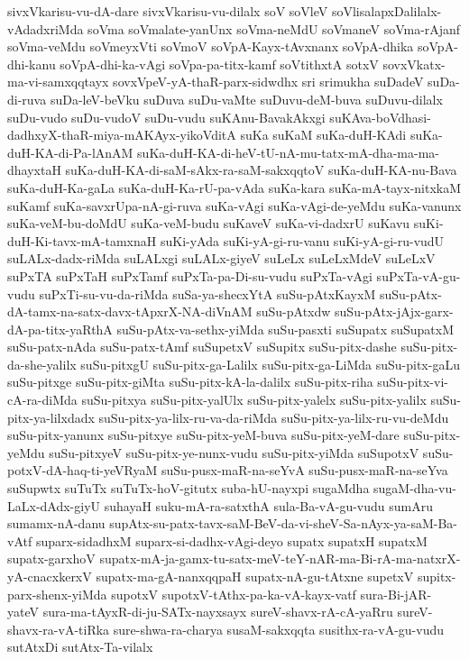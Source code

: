 {sivxVkarisu-vu-dA-dare
sivxVkarisu-vu-dilalx
soV
soVleV
soVlisalapxDalilalx-vAdadxriMda
soVma
soVmalate-yanUnx
soVma-neMdU
soVmaneV
soVma-rAjanf
soVma-veMdu
soVmeyxVti
soVmoV
soVpA-Kayx-tAvxnanx
soVpA-dhika
soVpA-dhi-kanu
soVpA-dhi-ka-vAgi
soVpa-pa-titx-kamf
soVtithxtA
sotxV
sovxVkatx-ma-vi-samxqqtayx
sovxVpeV-yA-thaR-parx-sidwdhx
sri
srimukha
suDadeV
suDa-di-ruva
suDa-leV-beVku
suDuva
suDu-vaMte
suDuvu-deM-buva
suDuvu-dilalx
suDu-vudo
suDu-vudoV
suDu-vudu
suKAnu-BavakAkxgi
suKAva-boVdhasi-dadhxyX-thaR-miya-mAKAyx-yikoVditA
suKa
suKaM
suKa-duH-KAdi
suKa-duH-KA-di-Pa-lAnAM
suKa-duH-KA-di-heV-tU-nA-mu-tatx-mA-dha-ma-ma-dhayxtaH
suKa-duH-KA-di-saM-sAkx-ra-saM-sakxqqtoV
suKa-duH-KA-nu-Bava
suKa-duH-Ka-gaLa
suKa-duH-Ka-rU-pa-vAda
suKa-kara
suKa-mA-tayx-nitxkaM
suKamf
suKa-savxrUpa-nA-gi-ruva
suKa-vAgi
suKa-vAgi-de-yeMdu
suKa-vanunx
suKa-veM-bu-doMdU
suKa-veM-budu
suKaveV
suKa-vi-dadxrU
suKavu
suKi-duH-Ki-tavx-mA-tamxnaH
suKi-yAda
suKi-yA-gi-ru-vanu
suKi-yA-gi-ru-vudU
suLALx-dadx-riMda
suLALxgi
suLALx-giyeV
suLeLx
suLeLxMdeV
suLeLxV
suPxTA
suPxTaH
suPxTamf
suPxTa-pa-Di-su-vudu
suPxTa-vAgi
suPxTa-vA-gu-vudu
suPxTi-su-vu-da-riMda
suSa-ya-shecxYtA
suSu-pAtxKayxM
suSu-pAtx-dA-tamx-na-satx-davx-tApxrX-NA-diVnAM
suSu-pAtxdw
suSu-pAtx-jAjx-garx-dA-pa-titx-yaRthA
suSu-pAtx-va-sethx-yiMda
suSu-pasxti
suSupatx
suSupatxM
suSu-patx-nAda
suSu-patx-tAmf
suSupetxV
suSupitx
suSu-pitx-dashe
suSu-pitx-da-she-yalilx
suSu-pitxgU
suSu-pitx-ga-Lalilx
suSu-pitx-ga-LiMda
suSu-pitx-gaLu
suSu-pitxge
suSu-pitx-giMta
suSu-pitx-kA-la-dalilx
suSu-pitx-riha
suSu-pitx-vi-cA-ra-diMda
suSu-pitxya
suSu-pitx-yalUlx
suSu-pitx-yalelx
suSu-pitx-yalilx
suSu-pitx-ya-lilxdadx
suSu-pitx-ya-lilx-ru-va-da-riMda
suSu-pitx-ya-lilx-ru-vu-deMdu
suSu-pitx-yanunx
suSu-pitxye
suSu-pitx-yeM-buva
suSu-pitx-yeM-dare
suSu-pitx-yeMdu
suSu-pitxyeV
suSu-pitx-ye-nunx-vudu
suSu-pitx-yiMda
suSupotxV
suSu-potxV-dA-haq-ti-yeVRyaM
suSu-pusx-maR-na-seYvA
suSu-pusx-maR-na-seYva
suSupwtx
suTuTx
suTuTx-hoV-gitutx
suba-hU-nayxpi
sugaMdha
sugaM-dha-vu-LaLx-dAdx-giyU
suhayaH
suku-mA-ra-satxthA
sula-Ba-vA-gu-vudu
sumAru
sumamx-nA-danu
supAtx-su-patx-tavx-saM-BeV-da-vi-sheV-Sa-nAyx-ya-saM-Ba-vAtf
suparx-sidadhxM
suparx-si-dadhx-vAgi-deyo
supatx
supatxH
supatxM
supatx-garxhoV
supatx-mA-ja-gamx-tu-satx-meV-teY-nAR-ma-Bi-rA-ma-natxrX-yA-cnacxkerxV
supatx-ma-gA-nanxqqpaH
supatx-nA-gu-tAtxne
supetxV
supitx-parx-shenx-yiMda
supotxV
supotxV-tAthx-pa-ka-vA-kayx-vatf
sura-Bi-jAR-yateV
sura-ma-tAyxR-di-ju-SATx-nayxsayx
sureV-shavx-rA-cA-yaRru
sureV-shavx-ra-vA-tiRka
sure-shwa-ra-charya
susaM-sakxqqta
susithx-ra-vA-gu-vudu
sutAtxDi
sutAtx-Ta-vilalx
}

